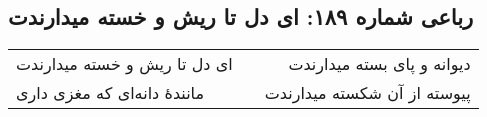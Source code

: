 \begin{center}
\section*{رباعی شماره ۱۸۹: ای دل تا ریش و خسته میدارندت}
\label{sec:0189}
\begin{longtable}{l p{0.5cm} r}
ای دل تا ریش و خسته میدارندت
&&
دیوانه و پای بسته میدارندت
\\
مانندهٔ دانه‌ای که مغزی داری
&&
پیوسته از آن شکسته میدارندت
\\
\end{longtable}
\end{center}
